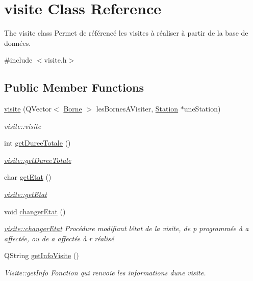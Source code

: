 \hypertarget{classvisite}{}\section{visite Class Reference}
\label{classvisite}


The visite class Permet de référencé les visites à réaliser à partir de la base de données.  




{\ttfamily \#include $<$visite.\+h$>$}

\subsection*{Public Member Functions}
\begin{DoxyCompactItemize}
\item 
\hyperlink{classvisite_a197936c1244f7c9fd0a2eca7038533f9}{visite} (Q\+Vector$<$ \hyperlink{class_borne}{Borne} $>$ les\+Bornes\+A\+Visiter, \hyperlink{class_station}{Station} $\ast$une\+Station)
\begin{DoxyCompactList}\small\item\em visite\+::visite \end{DoxyCompactList}\item 
int \hyperlink{classvisite_a608738dbddc358c0805228e0aac5818c}{get\+Duree\+Totale} ()
\begin{DoxyCompactList}\small\item\em \hyperlink{classvisite_a608738dbddc358c0805228e0aac5818c}{visite\+::get\+Duree\+Totale} \end{DoxyCompactList}\item 
char \hyperlink{classvisite_a6da950d2a01048158c7abcc1ebdfec22}{get\+Etat} ()
\begin{DoxyCompactList}\small\item\em \hyperlink{classvisite_a6da950d2a01048158c7abcc1ebdfec22}{visite\+::get\+Etat} \end{DoxyCompactList}\item 
\mbox{\label{classvisite_a731243b15c082ddff3294c09524c39e4}} 
void \hyperlink{classvisite_a731243b15c082ddff3294c09524c39e4}{changer\+Etat} ()
\begin{DoxyCompactList}\small\item\em \hyperlink{classvisite_a731243b15c082ddff3294c09524c39e4}{visite\+::changer\+Etat} Procédure modifiant l\textquotesingle{}état de la visite, de \textquotesingle{}p\textquotesingle{} programmée à \textquotesingle{}a\textquotesingle{} affectée, ou de \textquotesingle{}a\textquotesingle{} affectée à \textquotesingle{}r\textquotesingle{} réalisé \end{DoxyCompactList}\item 
Q\+String \hyperlink{classvisite_a7a948dd8b5c805a1f2a7d62c9268cb97}{get\+Info\+Visite} ()
\begin{DoxyCompactList}\small\item\em Visite\+::get\+Info Fonction qui renvoie les informations d\textquotesingle{}une visite. \end{DoxyCompactList}\end{DoxyCompactItemize}


